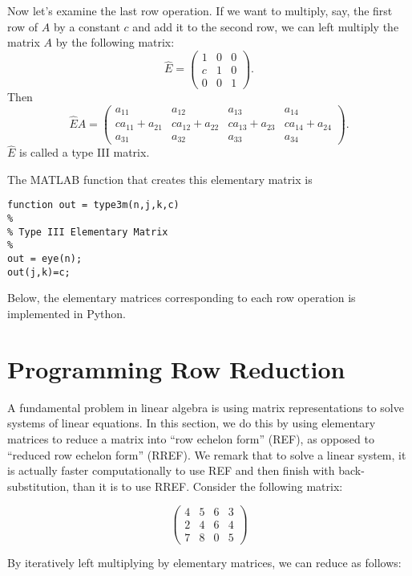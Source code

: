 Now let's examine the last row operation.  If we want to multiply,
say, the first row of $A$ by a constant $c$ and add it to the second
row, we can left multiply the matrix $A$ by the following matrix:
\[
\widehat{E} = \begin{pmatrix}
1&0&0\\
c&1&0\\
0&0&1
\end{pmatrix}.
\]
Then
\[
\widehat{E} A =
\begin{pmatrix}
a_{11}&a_{12}&a_{13}&a_{14}\\
c a_{11} + a_{21}&c a_{12} + a_{22}&c a_{13} + a_{23}&c a_{14} + a_{24}\\
a_{31}&a_{32}&a_{33}&a_{34}
\end{pmatrix}.
\]
$\widehat{E}$ is called a type III matrix.
\begin{matlab}
The MATLAB function that creates this elementary matrix is
\begin{lstlisting}[style=matlab]
function out = type3m(n,j,k,c)
%
% Type III Elementary Matrix
%
out = eye(n); 
out(j,k)=c;
\end{lstlisting}
\end{matlab}

\begin{python}
Below, the elementary matrices corresponding to each row operation is implemented in Python.

\end{python}

\section*{Programming Row Reduction}

A fundamental problem in linear algebra is using matrix representations to solve systems of linear equations.  In this section, we do this by using elementary matrices to reduce a matrix into ``row echelon form'' (REF), as opposed to ``reduced row echelon form'' (RREF).  We remark that to solve a linear system, it is actually faster computationally to use REF and then finish with back-substitution, than it is to use RREF.  Consider the following matrix: 

\[
\begin{pmatrix}
4&5&6&3 \\
2&4&6&4 \\
7&8&0&5
\end{pmatrix}
\]

By iteratively left multiplying by elementary matrices, we can reduce as follows:


